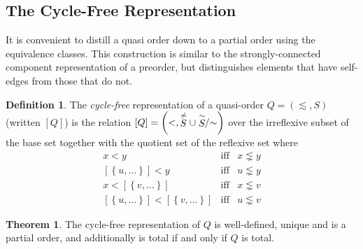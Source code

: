 \documentclass[12pt]{article}
\theoremstyle{definition}
\newtheorem{definition}{Definition}[section]
\theoremstyle{theorem}
\newtheorem{theorem}{Theorem}[section]
\def\aset#1{\left\{{#1}\right\}}
\begin{document}
\subsection{The Cycle-Free Representation}

It is convenient to distill a quasi order down to a partial order
using the equivalence classes.  This construction is similar to the
strongly-connected component representation of a preorder, but
distinguishes elements that have self-edges from those that do not.

\begin{definition}
  The \emph{cycle-free} representation of a quasi-order
  $Q=(\lesssim,S)$ (written $[Q]$) is the relation \( [Q] = \left(<,
  \stackrel{\not\sim}{S} \cup \stackrel{\sim}{S}\!\!/{\mathord\sim}\right) \) over the irreflexive
  subset of the base set together with the quotient set of the
  reflexive set where
  \begin{eqnarray*}
    x < y &\textrm{iff}& x \lnsim y \\
    {[\aset{u,\ldots}]} < y &\textrm{iff}& u \lnsim y \\
    x < [\aset{v,\ldots}] & \textrm{iff}& x \lnsim v \\
    {[\aset{u,\ldots}]} < [\aset{v,\ldots}] & \textrm{iff} & u \lnsim
    v
  \end{eqnarray*}
\end{definition}
\begin{theorem}
  The cycle-free representation of $Q$ is well-defined, unique and is a
  partial order, and additionally is total if and only if $Q$ is total.
\end{theorem}
\end{document}
